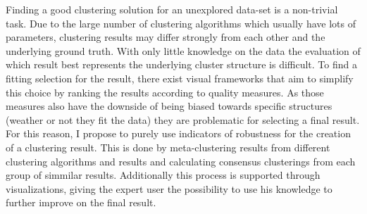 \iffalse  \fi

Finding a good clustering solution for an unexplored data-set is a non-trivial task. Due to the large number of clustering algorithms which usually have lots of parameters, clustering results may differ strongly from each other and the underlying ground truth. With only little knowledge on the data the evaluation of which result best represents the underlying cluster structure is difficult. To find a fitting selection for the result, there exist visual frameworks that aim to simplify this choice by ranking the results according to quality measures. As those measures also have the downside of being biased towards specific structures (weather or not they fit the data) they are problematic for selecting a final result. For this reason, I propose to purely use indicators of robustness for the creation of a clustering result. This is done by meta-clustering results from different clustering algorithms and results and calculating consensus clusterings from each group of simmilar results. Additionally this process is supported through visualizations, giving the expert user the possibility to use his knowledge to further improve on the final result.
